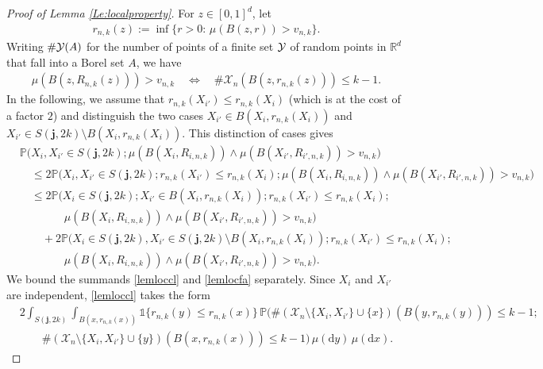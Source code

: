 \documentclass{article}
\theoremstyle{thm}
\theoremstyle{definition}
\theoremstyle{definition}
\theoremstyle{def}
\newcommand{\PP}{\mathbb{P}} %
\newcommand{\jj}{\mathbf{j}}
\begin{document}
\begin{proof}[Proof of Lemma \ref{Le:localproperty}] For $z \in {[0,1]^d}$, let
	\begin{align*}
		r_{n,k}(z):=\inf\{r>0:\,\mu(B(z,r))> v_{n,k}\}.
	\end{align*}
	Writing $\#{\cal Y}(A)$ for the number of points of a finite set ${\cal Y}$ of random points in
	$\mathbb{R}^d$ that fall into a Borel set $A$, we have
	\begin{align*}
		\mu(B(z,R_{n,k}(z)))>v_{n,k}\quad \Longleftrightarrow \quad \# \mathcal{X}_n(B(z,r_{n,k}(z))) \le k-1.
	\end{align*}
	In the following, we assume that $r_{n,k}(X_{i'})\le r_{n,k}(X_{i})$ (which is at the cost of a factor $2$) and distinguish the two cases $X_{i'} \in B(X_i,r_{n,k}(X_{i}))$ and $X_{i'} \in S(\jj,2k) \setminus B(X_i,r_{n,k}(X_{i}))$. This distinction of cases gives
	\begin{align}
		&\PP \big( X_i,X_{i'}\in S(\jj,2k);  \mu(B(X_i,R_{i,n,k})) \wedge \mu(B(X_{i'},R_{i',n,k}))>v_{n,k} \big)\nonumber\\
		&\quad\le 2 \PP \big( X_i,X_{i'}\in S(\jj,2k); r_{n,k}(X_{i'})\le r_{n,k}(X_{i}); \mu(B(X_i,R_{i,n,k})) \wedge \mu(B(X_{i'},R_{i',n,k}))>v_{n,k} \big)\nonumber\\
		&\quad \le 2 \PP \big( X_i \in S(\jj,2k); X_{i'} \in  B(X_i,r_{n,k}(X_{i})); r_{n,k}(X_{i'})\le r_{n,k}(X_{i});\nonumber\\ &\quad \quad \quad \quad \mu(B(X_i,R_{i,n,k})) \wedge \mu(B(X_{i'},R_{i',n,k}))>v_{n,k} \big)\label{lemloccl}\\
		&\quad \quad +2 \PP \big( X_i\in S(\jj,2k),X_{i'} \in S(\jj,2k) \setminus B(X_i,r_{n,k}(X_{i})); r_{n,k}(X_{i'})\le r_{n,k}(X_{i});\nonumber\\
		&\quad \quad \quad \quad  \mu(B(X_i,R_{i,n,k}))\wedge \mu(B(X_{i'},R_{i',n,k}))>v_{n,k} \big).\label{lemlocfa}
	\end{align}
	We bound the summands \eqref{lemloccl} and \eqref{lemlocfa} separately. Since $X_i$ and $X_{i'}$  are independent, \eqref{lemloccl} takes the form
	\begin{align}
		&2\int_{S(\jj,2k)} \int_{B(x,r_{n,k}(x))}\mathds{1}\{r_{n,k}(y) \le r_{n,k}(x)\} \, \PP(\#(\mathcal{X}_n \setminus \{X_i,X_{i'}\} \cup \{x\})(B(y,r_{n,k}(y)))\le k-1; \nonumber\\
		&\quad \quad \#(\mathcal{X}_n \setminus \{X_i,X_{i'}\} \cup \{y\})(B(x,r_{n,k}(x)))\le k-1)\,\mu(\mathrm{d}y)\,\mu(\mathrm{d}x).\label{lemlocclint}
	\end{align}

\end{proof}
\end{document}

